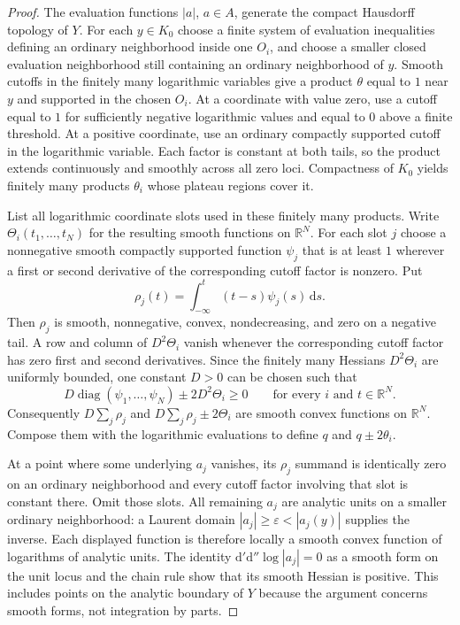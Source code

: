 \begin{proof}
The evaluation functions $|a|$, $a\in A$, generate the compact Hausdorff topology of $Y$. For each $y\in K_0$ choose a finite system of evaluation inequalities defining an ordinary neighborhood inside one $O_i$, and choose a smaller closed evaluation neighborhood still containing an ordinary neighborhood of $y$. Smooth cutoffs in the finitely many logarithmic variables give a product $\theta$ equal to $1$ near $y$ and supported in the chosen $O_i$. At a coordinate with value zero, use a cutoff equal to $1$ for sufficiently negative logarithmic values and equal to $0$ above a finite threshold. At a positive coordinate, use an ordinary compactly supported cutoff in the logarithmic variable. Each factor is constant at both tails, so the product extends continuously and smoothly across all zero loci. Compactness of $K_0$ yields finitely many products $\theta_i$ whose plateau regions cover it.

List all logarithmic coordinate slots used in these finitely many products. Write $\Theta_i(t_1,\ldots,t_N)$ for the resulting smooth functions on $\mathbb{R}^N$. For each slot $j$ choose a nonnegative smooth compactly supported function $\psi_j$ that is at least $1$ wherever a first or second derivative of the corresponding cutoff factor is nonzero. Put
\[
\rho_j(t)=\int_{-\infty}^{t}(t-s)\psi_j(s)\,\mathrm{d}s.
\]
Then $\rho_j$ is smooth, nonnegative, convex, nondecreasing, and zero on a negative tail. A row and column of $D^2\Theta_i$ vanish whenever the corresponding cutoff factor has zero first and second derivatives. Since the finitely many Hessians $D^2\Theta_i$ are uniformly bounded, one constant $D>0$ can be chosen such that
\[
D\operatorname{diag}(\psi_1,\ldots,\psi_N)\pm 2D^2\Theta_i\geq0
\qquad\text{for every }i\text{ and }t\in\mathbb{R}^N.
\]
Consequently $D\sum_j\rho_j$ and $D\sum_j\rho_j\pm2\Theta_i$ are smooth convex functions on $\mathbb{R}^N$. Compose them with the logarithmic evaluations to define $q$ and $q\pm2\theta_i$.

At a point where some underlying $a_j$ vanishes, its $\rho_j$ summand is identically zero on an ordinary neighborhood and every cutoff factor involving that slot is constant there. Omit those slots. All remaining $a_j$ are analytic units on a smaller ordinary neighborhood: a Laurent domain $|a_j|\geq\varepsilon<|a_j(y)|$ supplies the inverse. Each displayed function is therefore locally a smooth convex function of logarithms of analytic units. The identity $\mathrm{d}'\mathrm{d}''\log|a_j|=0$ as a smooth form on the unit locus \cite[Lemma~16.7.4]{CLD25} and the chain rule show that its smooth Hessian is positive. This includes points on the analytic boundary of $Y$ because the argument concerns smooth forms, not integration by parts.
\end{proof}

